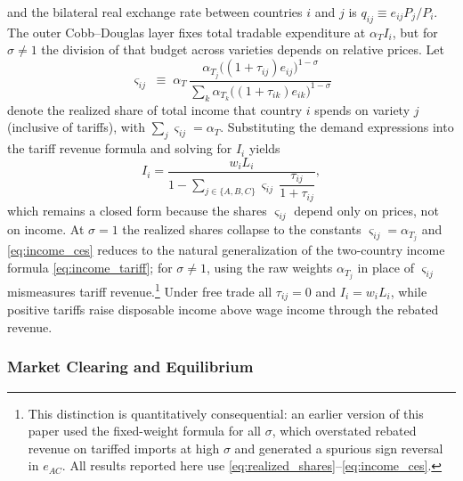 \documentclass[11pt]{article}
\theoremstyle{plain}
\theoremstyle{remark}
\numberwithin{lemma}{section}
\numberwithin{proposition}{section}
\numberwithin{corollary}{section}
\newcommand{\rev}[1]{{\color{RevBlue}#1}}
\begin{document}
and the bilateral real exchange rate between countries $i$ and $j$ is $q_{ij} \equiv e_{ij} P_j / P_i$. \rev{The outer Cobb--Douglas layer fixes total tradable expenditure at $\alpha_T I_i$, but for $\sigma \neq 1$ the division of that budget across varieties depends on relative prices. Let
\begin{equation}
\varsigma_{ij} \;\equiv\; \alpha_T\, \frac{\alpha_{T_j} \bigl((1+\tau_{ij})e_{ij}\bigr)^{1-\sigma}}{\sum_{k} \alpha_{T_k} \bigl((1+\tau_{ik})e_{ik}\bigr)^{1-\sigma}}
\label{eq:realized_shares}
\end{equation}
denote the realized share of total income that country $i$ spends on variety $j$ (inclusive of tariffs), with $\sum_j \varsigma_{ij} = \alpha_T$. Substituting the demand expressions into the tariff revenue formula and solving for $I_i$ yields
\begin{equation}
I_i = \frac{w_i L_i}{1 - \displaystyle\sum_{j \in \{A,B,C\}} \varsigma_{ij}\, \dfrac{\tau_{ij}}{1+\tau_{ij}}},
\label{eq:income_ces}
\end{equation}
which remains a closed form because the shares $\varsigma_{ij}$ depend only on prices, not on income. At $\sigma = 1$ the realized shares collapse to the constants $\varsigma_{ij} = \alpha_{T_j}$ and \eqref{eq:income_ces} reduces to the natural generalization of the two-country income formula \eqref{eq:income_tariff}; for $\sigma \neq 1$, using the raw weights $\alpha_{T_j}$ in place of $\varsigma_{ij}$ mismeasures tariff revenue.\footnote{\rev{This distinction is quantitatively consequential: an earlier version of this paper used the fixed-weight formula for all $\sigma$, which overstated rebated revenue on tariffed imports at high $\sigma$ and generated a spurious sign reversal in $e_{AC}$. All results reported here use \eqref{eq:realized_shares}--\eqref{eq:income_ces}.}} Under free trade all $\tau_{ij} = 0$ and $I_i = w_i L_i$, while positive tariffs raise disposable income above wage income through the rebated revenue.}

\subsubsection{Market Clearing and Equilibrium}
\label{sec:equilibrium}
\end{document}
